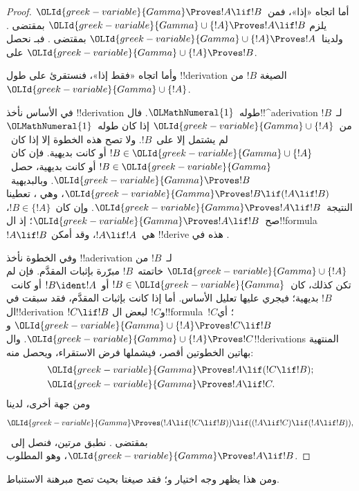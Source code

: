 \documentclass[../../../include/open-logic-section]{subfiles}
\begin{document}
\begin{proof}
أما اتجاه «إذا»، فمن~$\OLId{greek-variable}{Gamma} \Proves !A \lif !B$ يلزم
$\OLId{greek-variable}{Gamma} \cup \{!A\} \Proves !A \lif !B$ بمقتضى
. ولدينا~$\OLId{greek-variable}{Gamma} \cup \{!A\} \Proves !A$
بمقتضى . فبـ نحصل على
$\OLId{greek-variable}{Gamma} \cup \{!A\} \Proves !B$.


وأما اتجاه «فقط إذا»، فنستقرئ على طول !!{derivation} الصيغة
$!B$ من~$\OLId{greek-variable}{Gamma} \cup \{!A\}$.

في الأساس نأخذ !!{derivation} طوله~$\OLMathNumeral{1}$.
فال!!^a{derivation} لـ~$!B$ من~$\OLId{greek-variable}{Gamma} \cup \{!A\}$ إذا كان
طوله~$\OLMathNumeral{1}$ لم يشتمل إلا على~$!B$. ولا تصح هذه الخطوة إلا إذا
كان~$!B \in \OLId{greek-variable}{Gamma} \cup \{!A\}$ أو كانت بديهية.
فإن كان~$!B \in \OLId{greek-variable}{Gamma}$ أو كانت بديهية، حصل~$\OLId{greek-variable}{Gamma} \Proves !B$.
وبالبديهية~$\OLId{greek-variable}{Gamma}
\Proves !B \lif (!A \lif !B)$، وهي ،
تعطينا  النتيجة~$\OLId{greek-variable}{Gamma} \Proves !A \lif !B$.
وإن كان~$!B \in \{ !A\}$، صح~$\OLId{greek-variable}{Gamma} \Proves !A \lif !B$؛
إذ ال!!{formula}~$!A \lif !B$ هي~$!A \lif !A$،
وقد أمكن !!{derive} هذه في .

وفي الخطوة نأخذ !!a{derivation} لـ~$!B$ من
$\OLId{greek-variable}{Gamma} \cup \{!A\}$ خاتمته~$!B$ مبرّرة بإثبات المقدَّم.
فإن لم تكن كذلك، كان~$!B \in \OLId{greek-variable}{Gamma}$ أو~$!B
\ident !A$ أو كانت~$!B$ بديهية؛ فيجري عليها تعليل الأساس.
أما إذا كانت بإثبات المقدَّم، فقد سبقت في ال!!{derivation}
$!C \lif !B$ و$!C$ لبعض ال!!{formula}~$!C$؛ أي
$\OLId{greek-variable}{Gamma} \cup \{!A\} \Proves !C \lif !B$ و$\OLId{greek-variable}{Gamma} \cup \{!A\}
\Proves !C$. وال!!{derivation}s المنتهية بهاتين الخطوتين أقصر،
فيشملها فرض الاستقراء، ويحصل منه:
\begin{align*}
  & \OLId{greek-variable}{Gamma} \Proves !A \lif (!C \lif !B); \\
  & \OLId{greek-variable}{Gamma} \Proves !A \lif !C.
\end{align*}
ومن جهة أخرى، لدينا
\[
\OLId{greek-variable}{Gamma} \Proves (!A \lif (!C \lif !B)) \lif
((!A\lif !C)  \lif (!A \lif !B)),
\]
بمقتضى . نطبق  مرتين،
فنصل إلى~$\OLId{greek-variable}{Gamma} \Proves !A \lif !B$، وهو المطلوب.
\end{proof}

ومن هذا يظهر وجه اختيار 
و؛ فقد صيغتا بحيث تصح مبرهنة الاستنباط.
\end{document}
